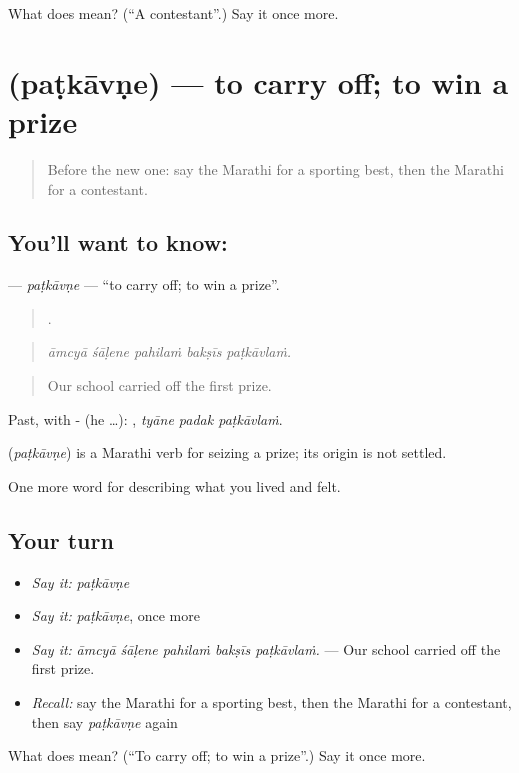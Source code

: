 \begin{tcolorbox}[breakable,colback=teal!4,colframe=teal!35!black,title={Before you move on}]
What does  mean? (\textquotedblleft{}A contestant\textquotedblright{}.) Say it once more.
\end{tcolorbox}
\section[\texorpdfstring{\mr{पटकावणे} (paṭkāvṇe)}{पटकावणे (paṭkāvṇe)}]{ (paṭkāvṇe) — to carry off; to win a prize}

\label{lesson:MR-C530-patkavne}



\begin{quote}
Before the new one: say the Marathi for a sporting best, then the Marathi for a contestant.
\end{quote}

\subsection*{You'll want to know: }
\textbf{} — \emph{paṭkāvṇe} — \textquotedblleft{}to carry off; to win a prize\textquotedblright{}.

\begin{quote}
    .
\end{quote}

\begin{quote}
\emph{āmcyā śāḷene pahilaṁ bakṣīs paṭkāvlaṁ.}
\end{quote}

\begin{quote}
Our school carried off the first prize.
\end{quote}

Past, with - (he …):   , \emph{tyāne padak paṭkāvlaṁ}.

\begin{cousinweb}
\textbf{} (\emph{paṭkāvṇe}) is a Marathi verb for seizing a prize; its origin is not settled.
\end{cousinweb}

\begin{grammarlens}[title={What you've built}]
One more word for describing what you lived and felt.
\end{grammarlens}

\subsection*{Your turn}
\begin{itemize}
\raggedright
  \item \emph{Say it:} \emph{paṭkāvṇe}
  \item \emph{Say it:} \emph{paṭkāvṇe}, once more
  \item \emph{Say it:} \emph{āmcyā śāḷene pahilaṁ bakṣīs paṭkāvlaṁ.} — Our school carried off the first prize.
  \item \emph{Recall:} say the Marathi for a sporting best, then the Marathi for a contestant, then say \emph{paṭkāvṇe} again
\end{itemize}

\begin{tcolorbox}[breakable,colback=teal!4,colframe=teal!35!black,title={Before you move on}]
What does  mean? (\textquotedblleft{}To carry off; to win a prize\textquotedblright{}.) Say it once more.
\end{tcolorbox}
